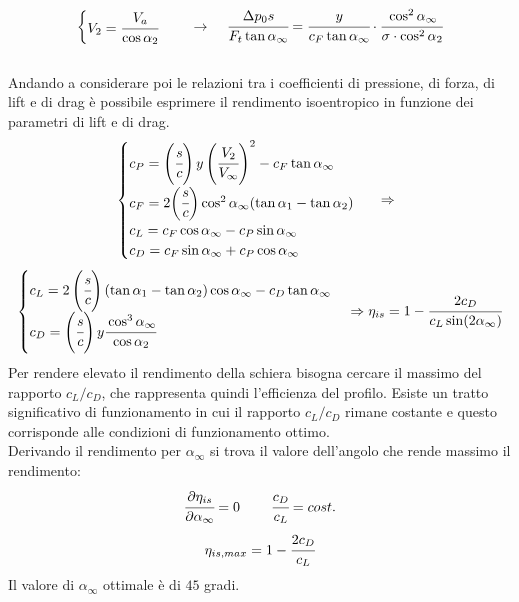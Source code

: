 \begin{itemize}
\begin{align*}
\begin{cases}
	V_2 = \cfrac{V_a}{\cos \alpha_2}
	\end{cases}
	\;\;\;\; \rightarrow \;\;\;\;
	\cfrac{\Delta p_0 s}{F_t \tan \alpha_{\infty}} = \cfrac{y}{c_F \tan \alpha_{\infty}} \cdot \cfrac{\cos^2 \alpha_{\infty}}{\sigma \cdot \cos^2 \alpha_2}
	\end{align*}
	\\Andando a considerare poi le relazioni tra i coefficienti di pressione, di forza, di lift e di drag è possibile esprimere il rendimento isoentropico in funzione dei parametri di lift e di drag.
	\begin{align*}
	\begin{cases}
	c_P = \left(  \cfrac{s}{c} \right) y \left( \cfrac{V_2}{V_{\infty}}  \right)^2 - c_F \tan \alpha_{\infty}\\
	c_F = 2 \bigg(\cfrac{s}{c} \bigg) \cos ^ 2 \alpha_{\infty}(\tan \alpha_1 - \tan \alpha_2)\\
	c_L = c_F \cos \alpha_{\infty} - c_P \sin \alpha_{\infty}\\
	c_D = c_F \sin \alpha_{\infty} + c_P \cos \alpha_{\infty}
	\end{cases}
	\;\; \Rightarrow \;\;
	\end{align*}
	\begin{align*}
	\begin{cases}
	c_L = 2 \left(  \cfrac{s}{c} \right) (\tan \alpha_1 - \tan \alpha_2) \cos \alpha_{\infty} - c_D \tan \alpha_{\infty}\\
	c_D= \left(  \cfrac{s}{c} \right) y \cfrac{\cos^3 \alpha_{\infty}}{\cos \alpha_2}
	\end{cases}
	\Rightarrow
	\eta_{is} = 1- \cfrac{2 c_D}{c_L \sin (2 \alpha_{\infty})}
	\end{align*}
	Per rendere elevato il rendimento della schiera bisogna cercare il massimo del rapporto $c_L/c_D$, che rappresenta quindi l'efficienza del profilo. Esiste un tratto significativo di funzionamento in cui il rapporto $c_L/c_D$ rimane costante e questo corrisponde alle condizioni di funzionamento ottimo.\\
	Derivando il rendimento per $\alpha_{\infty}$ si trova il valore dell'angolo che rende massimo il rendimento:
	\begin{align*}
	\cfrac{\partial \eta_{is}}{\partial \alpha_{\infty}} = 0 \;\;\;\;\;\;\;\; \cfrac{c_D}{c_L} = cost.
	\end{align*}
	\begin{align*}
	\eta_{is,max} = 1- \cfrac{2 c_D}{c_L}
	\end{align*}
	Il valore di $\alpha_{\infty}$ ottimale è di $45$ gradi.
\end{itemize}

